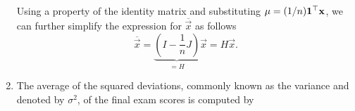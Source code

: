 \documentclass{ximera}
\begin{document}
\begin{example}
\begin{enumerate}
    Using a property of the identity matrix and substituting $\mu =
    (1/n) \mathbf{1}^\top \mathbf{x}$, we can further simplify the
    expression for $\overline{\vec{x}}$ as follows
    \[
      \overline{\vec{x}}
      = \underbrace{\left( I - \frac{1}{n}J \right)}_{=H} \vec{x} = H \vec{x}.
    \]
  \item The average of the squared deviations, commonly known as the
    variance and denoted by $\sigma^2$, of the final exam scores is
    computed by

\end{enumerate}
\end{example}
\end{document}
